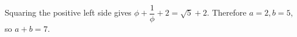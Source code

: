 Squaring the positive left side gives $\phi+\dfrac{1}{\phi}+2=\sqrt5+2$. Therefore $a=2,b=5$, so $\boxed{a+b=7}$.

